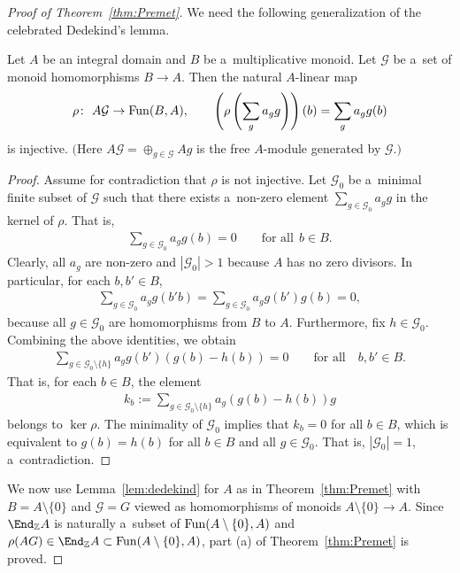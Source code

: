 \begin{proof}[Proof of Theorem~\ref{thm:Premet}]
We need the following generalization of the celebrated Dedekind's lemma.
\begin{Lemma}
\label{lem:dedekind}
Let $A$ be an integral domain and $B$ be a~multiplicative monoid.
Let $\mathcal G$ be a~set of monoid homomorphisms $B\to A$.
Then the natural $A$-linear map
\begin{gather*}
\rho\colon \ A\mathcal G \to {\rm Fun}(B,A),
\qquad
\left(\rho\left(\sum\limits_g a_g g\right)\right)(b) = \sum\limits_g a_g g(b)
\end{gather*}
is injective.
$($Here $A\mathcal G=\oplus_{g\in \mathcal G} Ag$ is the free $A$-module generated by $\mathcal G.)$
\end{Lemma}
\begin{proof}
Assume for contradiction that $\rho$ is not injective.
Let $\mathcal G _0$ be a~minimal f\/inite subset of $\mathcal G $ such that there exists a~non-zero element
$\sum\limits_{g\in \mathcal G _0}a_g g$ in the kernel of $\rho$.
That is,
\begin{gather*}
\sum\limits_{g\in \mathcal G _0}a_g g(b)=0
\qquad
\text{for all} \ \ b\in B.
\end{gather*}
Clearly, all $a_g$ are non-zero and $|\mathcal G _0|>1$ because $A$ has no zero divisors.
In particular, for each $b,b'\in B$,
\begin{gather*}
\sum\limits_{g\in \mathcal G _0} a_g g(b'b)=\sum\limits_{g\in \mathcal G _0} a_g g(b')g(b)=0,
\end{gather*}
because all $g\in \mathcal G _0$ are homomorphisms from $B$ to $A$.
Furthermore, f\/ix $h\in \mathcal G _0$.
Combining the above identities, we obtain
\begin{gather*}
\sum\limits_{g\in \mathcal G _0\setminus\{h\}} a_g g(b') (g(b) - h(b)) = 0
\qquad
\text{for all}\quad
b,b'\in B.
\end{gather*}
That is, for each $b\in B$, the element
\begin{gather*}
k_b:=\sum\limits_{g\in \mathcal G _0\setminus\{h\}} a_g (g(b) - h(b)) g
\end{gather*}
belongs to $\ker \rho$.
The minimality of $\mathcal G _0$ implies that $k_b=0$ for all $b\in B$, which is equivalent to $g(b)=h(b)$ for all
$b\in B$ and all $g\in \mathcal G _0$.
That is, $|\mathcal G _0|=1$, a~contradiction.
\end{proof}

We now use Lemma~\ref{lem:dedekind} for $A$ as in Theorem~\ref{thm:Premet} with $B=A\setminus\{0\}$ and $\mathcal G=G$
viewed as homomorphisms of monoids $A\setminus\{0\} \to A$.
Since $\End_\mathbb Z A$ is naturally a~subset of ${\rm Fun}(A\setminus\{0\},A)$ and $\rho(AG)\in \End_\mathbb Z
A\subset{\rm Fun}(A\setminus\{0\},A)$, part (a) of Theorem~\ref{thm:Premet} is proved.


\end{proof}
